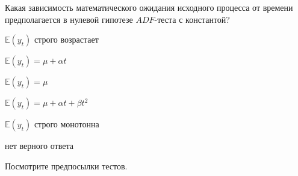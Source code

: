 
\begin{question}
Какая зависимость математического ожидания исходного процесса от времени предполагается в нулевой гипотезе \(ADF\)-теста с константой?
\begin{answerlist}
  \item \(\mathbb{E}(y_t)\) строго возрастает
  \item \(\mathbb{E}(y_t) = \mu + \alpha t\)
  \item \(\mathbb{E}(y_t) = \mu\)
  \item \(\mathbb{E}(y_t) = \mu + \alpha t + \beta t^2\)
  \item \(\mathbb{E}(y_t)\) строго монотонна
  \item нет верного ответа
\end{answerlist}
\end{question}

\begin{solution}
Посмотрите предпосылки тестов.
\end{solution}

